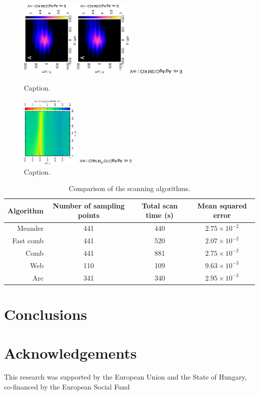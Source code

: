 \documentclass[3p]{elsarticle}
\begin{document}
\def\s{0.25}
\begin{figure}
\centering
\includegraphics[trim = 10mm 20mm 0mm 10mm, clip, width=\s\textwidth, angle=-90]{gnuplot_2d.eps}\includegraphics[trim = 10mm 20mm 0mm 10mm, clip, width=\s\textwidth, angle=-90]{gnuplot_2d.eps}\includegraphics[trim = 10mm 20mm 0mm 10mm, clip, width=\s\textwidth, angle=-90]{gnuplot_2d_deconvoluted.eps}
\caption{Caption.}
\label{fig:label1}
\end{figure}

\begin{figure}
\centering
\includegraphics[width=\s\textwidth, angle=-90]{test.eps}

\includegraphics[width=\s\textwidth, angle=-90]{test_deconvoluted.eps}
\caption{Caption.}
\label{fig:label1}
\end{figure}


\begin{table}
                \caption{Comparison of the scanning algorithms.}
                \label{table:comp}
                \centering
                \begin{tabular}{r c c c}
                        Algorithm & Number of sampling points & Total scan time (s) & Mean squared error \\
                        \hline
                        Meander & 441 & 440 & $2.75\times 10^{-2}$ \\
                        Fast comb & 441 & 520  & $2.07\times 10^{-2}$ \\
                        Comb & 441 & 881 & $2.75\times 10^{-2}$ \\
                        Web & 110 & 109 & $9.63\times 10^{-3}$ \\
                        Arc & 341 & 340 & $2.95\times 10^{-3}$ \\

                \end{tabular}

\end{table}

\section{Conclusions}
\section*{Acknowledgements}
This research was supported by the European Union and the State of Hungary, co-financed by the European Social Fund
\end{document}
